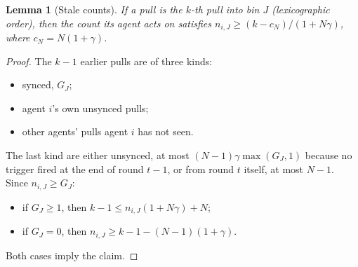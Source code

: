 \documentclass[11pt]{article}
\newtheorem{lemma}[theorem]{Lemma}
\theoremstyle{definition}
\begin{document}
\begin{lemma}[Stale counts]\label{lem:stale}
If a pull is the $k$-th pull into bin $J$ (lexicographic order), then the count its agent acts
on satisfies $n_{i,J}\ge(k-c_N)/(1+N\gamma)$, where $c_N=N(1+\gamma)$.
\end{lemma}
\begin{proof}
The $k-1$ earlier pulls are of three kinds:
\begin{itemize}[nosep]
\item synced, $G_J$;
\item agent $i$'s own unsynced pulls;
\item other agents' pulls agent $i$ has not seen.
\end{itemize}
The last kind are either unsynced, at most $(N-1)\gamma\max(G_J,1)$ because no trigger fired at
the end of round $t-1$, or from round $t$ itself, at most $N-1$. Since $n_{i,J}\ge G_J$:
\begin{itemize}[nosep]
\item if $G_J\ge1$, then $k-1\le n_{i,J}(1+N\gamma)+N$;
\item if $G_J=0$, then $n_{i,J}\ge k-1-(N-1)(1+\gamma)$.
\end{itemize}
Both cases imply the claim.
\end{proof}
\end{document}
